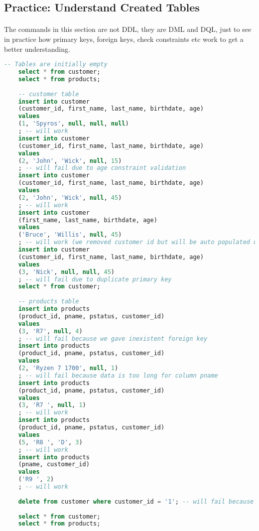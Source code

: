 \subsection{Practice: Understand Created Tables}
\paragraph{} The commands in this section are not \acs{DDL}, they are \acs{DML} and \acs{DQL}, just to see in practice how primary keys, foreign keys, check constraints etc work to get a better understanding.
\begin{lstlisting}[language=SQL]
	-- Tables are initially empty
	select * from customer;
	select * from products;
	
	-- customer table
	insert into customer 
	(customer_id, first_name, last_name, birthdate, age)
	values
	(1, 'Spyros', null, null, null)
	; -- will work
	insert into customer 
	(customer_id, first_name, last_name, birthdate, age)
	values
	(2, 'John', 'Wick', null, 15)
	; -- will fail due to age constraint validation
	insert into customer 
	(customer_id, first_name, last_name, birthdate, age)
	values
	(2, 'John', 'Wick', null, 45)
	; -- will work
	insert into customer 
	(first_name, last_name, birthdate, age)
	values
	('Bruce', 'Willis', null, 45)
	; -- will work (we removed customer id but will be auto populated due to auto_increment attribute)
	insert into customer 
	(customer_id, first_name, last_name, birthdate, age)
	values
	(3, 'Nick', null, null, 45)
	; -- will fail due to duplicate primary key
	select * from customer;
	
	-- products table
	insert into products
	(product_id, pname, pstatus, customer_id)
	values
	(3, 'R7', null, 4)
	; -- will fail because we gave inexistent foreign key
	insert into products
	(product_id, pname, pstatus, customer_id)
	values
	(2, 'Ryzen 7 1700', null, 1)
	; -- will fail because data is too long for column pname
	insert into products
	(product_id, pname, pstatus, customer_id)
	values
	(3, 'R7 ', null, 1)
	; -- will work
	insert into products
	(product_id, pname, pstatus, customer_id)
	values
	(5, 'R8 ', 'D', 3)
	; -- will work
	insert into products
	(pname, customer_id)
	values
	('R9 ', 2)
	; -- will work
	
	delete from customer where customer_id = '1'; -- will fail because there are data in table products that reference that customer id
	
	select * from customer;
	select * from products;
\end{lstlisting}
